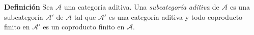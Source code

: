 \documentclass[preview]{standalone}
\begin{document}
\begin{center}
\justifying \textbf{Definición} Sea $\mathscr{A}$ una categoría aditiva. Una \emph{subcategoría} \emph{aditiva} de $\mathscr{A}$ es una subcategoría $\mathscr{A}'$ de $\mathscr{A}$ tal que $\mathscr{A}'$ es una categoría aditiva y todo coproducto finito en $\mathscr{A}'$ es un coproducto finito en $\mathscr{A}$.
\end{center}
\end{document}
